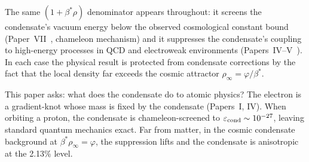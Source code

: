 \documentclass[11pt,a4paper]{article}
\theoremstyle{definition}
\theoremstyle{remark}
\newcommand{\vp}{\varphi}
\newcommand{\bst}{\beta^{*}}
\newcommand{\eps}{\varepsilon}
\begin{document}
The same $(1+\bst\rho)$ denominator appears throughout:
it screens the condensate's vacuum energy below the observed
cosmological constant bound (Paper~VII~\cite{Paper7}, chameleon mechanism)
and it suppresses the condensate's coupling to high-energy processes
in QCD and electroweak environments (Papers~IV--V~\cite{Paper4,Paper5}).
In each case the physical result is protected from condensate
corrections by the fact that the local density far exceeds the
cosmic attractor $\rho_\infty=\vp/\bst$.

This paper asks: what does the condensate do to atomic physics?
The electron is a gradient-knot whose mass is fixed by the condensate
(Papers~I, IV).
When orbiting a proton, the condensate is chameleon-screened to
$\eps_{\rm cond}\sim10^{-27}$, leaving standard quantum mechanics exact.
Far from matter, in the cosmic condensate background at $\bst\rho_\infty=\vp$,
the suppression lifts and the condensate is anisotropic at the 2.13\% level.
\end{document}
